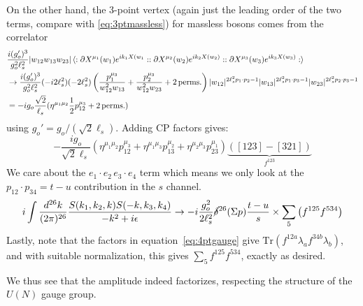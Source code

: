\documentclass[11pt, class=article, crop=false]{standalone}
\begin{document}
\begin{enumerate}
\begin{equation}
	\end{equation}
	On the other hand, the 3-point vertex (again just the leading order of the two terms, compare with \eqref{eq:3ptmassless}) for massless bosons comes from the correlator 
	\[
	\begin{aligned}
		&\frac{i (g_o')^3}{g_o^2 \ell_s^2} |w_{12} w_{13} w_{23}| \braket{:\partial X^{\mu_1}(w_1) e^{i k_1 X(w_1}: :\partial X^{\mu_2}(w_2) e^{i k_2 X(w_2)}: :\partial X^{\mu_3}(w_3) e^{i k_3 X(w_3)}:}\\
		&\to \frac{i (g'_o)^3}{g_o^2 \ell_s^2} (-i 2 \ell_s^2) (-2 \ell_s^2) \left( \frac{p_1^{\mu_3}}{w_{12}^2 w_{13}} + \frac{p_2^{\mu_3}}{w_{12}^2 w_{23}} + 2 \,\mathrm{perms.} \right) |w_{12}|^{2 \ell_s^2 p_1 \cdot p_2- 1} | w_{13}|^{2 \ell_s^2 p_1 \cdot p_3 - 1} | w_{23}|^{2 \ell_s^2 p_2 \cdot p_3 - 1} \\
		&= -i g_o \frac{\sqrt 2}{\ell_s} (\eta^{\mu_1 \mu_2}\frac12 p_{12}^{\mu_3} + 2 \,\mathrm{perms.}) 
	\end{aligned}
	\]
	using $g_o' = g_o/(\sqrt 2 \ell_s)$. Adding CP factors gives:
	\[
		-\frac{i g_o}{\sqrt 2 \ell_s} (\eta^{\mu_1 \mu_2} p_{12}^{\mu_3} + \eta^{\mu_1 \mu_3} p_{13}^{\mu_2} + \eta^{\mu_2 \mu_3} p_{23}^{\mu_1}) \underbrace{([123] - [321])}_{f^{123}}
	\]
	We care about the $e_1 \cdot e_2 \, e_3 \cdot e_4$ term which means we only look at the $p_{12} \cdot p_{34} = t - u$ contribution in the $s$ channel.
	\[
		i \int \frac{d^{26}k}{(2\pi)^{26}} \frac{S(k_1, k_2, k) S(-k, k_3, k_4)}{-k^2 + i \epsilon} \to - i \frac{g_o^2}{2 \ell_s^2} \cancel\delta^{26}(\Sigma p) \frac{t-u}{s} \times \sum_{5} \left( f^{125} f^{534} \right)
	\]
	Lastly, note that the factors in equation~\eqref{eq:4ptgauge} give $\mathrm{Tr}(f^{12a} \lambda_a f^{34b} \lambda_b)$, and with suitable normalization, this gives $\sum_5 f^{125} f^{534}$, exactly as desired. 
	
	We thus see that the amplitude indeed factorizes, respecting the structure of the $U(N)$ gauge group. 
	

\end{enumerate}
\end{document}

